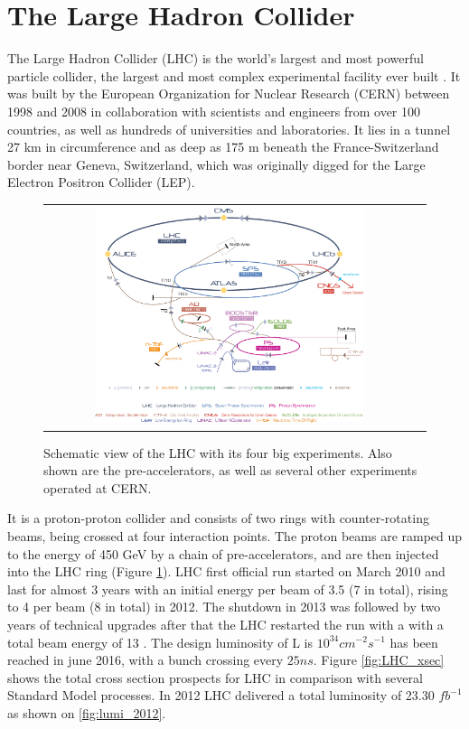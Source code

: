

\section{The Large Hadron Collider}

The Large Hadron Collider (LHC) is the world's largest and most powerful particle collider, the largest and most complex experimental facility ever built \cite{ipac11:lamont}. It was built by the European Organization for Nuclear Research (CERN) between 1998 and 2008 in collaboration with scientists and engineers from over 100 countries, as well as hundreds of universities and laboratories. It lies in a tunnel 27 km in circumference and as deep as 175 m beneath the France-Switzerland border near Geneva, Switzerland, which was originally digged for the Large Electron Positron Collider (LEP). 

\begin{figure}[tbh!]
	\centering
	\begin{tabular}{cc}
		\includegraphics[width=0.75\textwidth]{detector/pics/CERN_complex.jpg}
	\end{tabular}
	\caption{Schematic view of the LHC with its four big experiments. Also shown are the pre-accelerators, as well as several other experiments operated at CERN.}
	\label{fig:CERN_complex}
\end{figure}

It is a proton-proton collider and consists of two rings with counter-rotating beams, being crossed at four interaction points. The proton beams are ramped up to the energy of 450 GeV by a chain of pre-accelerators, and are then injected into the LHC ring (Figure \ref{fig:CERN_complex}). LHC first official run started on March 2010 and last for almost 3 years with an initial energy per beam of 3.5 \tev (7 \tev in total), rising to 4 \tev per beam (8 \tev in total) in 2012. The shutdown in 2013 was followed by two years of technical upgrades after that the LHC restarted the run with a with a total beam energy of 13 \tev. The design luminosity of L is $10^{34} cm^{-2}s^{-1}$ has been reached in june 2016, with a bunch crossing every $25 ns$. Figure \ref{fig:LHC_xsec} shows the total cross section prospects for LHC in comparison with several Standard Model processes. In 2012 LHC delivered a total luminosity of 23.30 $fb^{-1}$ as shown on \ref{fig:lumi_2012}.

